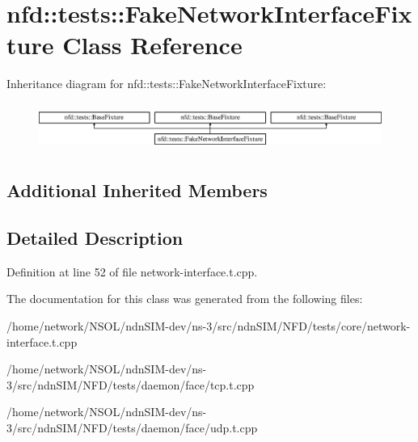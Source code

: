 \hypertarget{classnfd_1_1tests_1_1FakeNetworkInterfaceFixture}{}\section{nfd\+:\+:tests\+:\+:Fake\+Network\+Interface\+Fixture Class Reference}
\label{classnfd_1_1tests_1_1FakeNetworkInterfaceFixture}
Inheritance diagram for nfd\+:\+:tests\+:\+:Fake\+Network\+Interface\+Fixture\+:\begin{figure}[H]
\begin{center}
\leavevmode
\includegraphics[height=1.568627cm]{classnfd_1_1tests_1_1FakeNetworkInterfaceFixture}
\end{center}
\end{figure}
\subsection*{Additional Inherited Members}


\subsection{Detailed Description}


Definition at line 52 of file network-\/interface.\+t.\+cpp.



The documentation for this class was generated from the following files\+:\begin{DoxyCompactItemize}
\item 
/home/network/\+N\+S\+O\+L/ndn\+S\+I\+M-\/dev/ns-\/3/src/ndn\+S\+I\+M/\+N\+F\+D/tests/core/network-\/interface.\+t.\+cpp\item 
/home/network/\+N\+S\+O\+L/ndn\+S\+I\+M-\/dev/ns-\/3/src/ndn\+S\+I\+M/\+N\+F\+D/tests/daemon/face/tcp.\+t.\+cpp\item 
/home/network/\+N\+S\+O\+L/ndn\+S\+I\+M-\/dev/ns-\/3/src/ndn\+S\+I\+M/\+N\+F\+D/tests/daemon/face/udp.\+t.\+cpp\end{DoxyCompactItemize}
